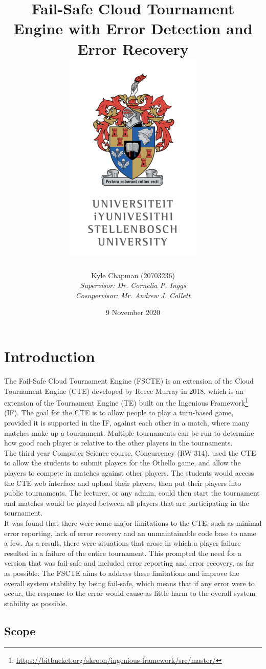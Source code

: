 \documentclass[a4paper, 11pt]{report}
\title{
	{Fail-Safe Cloud Tournament Engine with Error Detection and Error Recovery} \\
	{\includegraphics[scale=1.4]{logo.png}}
}
\author{
	{Kyle Chapman (20703236)} \\
	{\emph{Supervisor: Dr. Cornelia P. Inggs}} \\
	{\emph{Cosupervisor: Mr. Andrew J. Collett}}
}
\date{9 November 2020}
\begin{document}
\maketitle
\tableofcontents

\chapter{Introduction}

The Fail-Safe Cloud Tournament Engine (FSCTE) is an extension of the Cloud
Tournament Engine (CTE) developed by Reece Murray in 2018, which is an extension
of the Tournament Engine (TE) built on the Ingenious Framework\footnote{\url{https://bitbucket.org/skroon/ingenious-framework/src/master/}}
(IF). The goal for the CTE is to allow people to play a turn-based game, provided
it is supported in the IF, against each other in a match, where many matches
make up a tournament. Multiple tournaments can be run to determine how good
each player is relative to the other players in the tournaments. \\

The third year Computer Science course, Concurrency (RW 314), used the CTE to
allow the students to submit players for the Othello game, and allow the players
to \mbox{compete} in matches against other players. The students would
access the CTE web interface and upload their players, then put their players
into public tournaments. The lecturer, or any admin, could then start the
tournament and matches would be played between all players that are participating
in the tournament. \\

It was found that there were some major limitations to the CTE, such as minimal
error reporting, lack of error recovery and an unmaintainable code base to name
a few. As a result, there were situations that arose in which a player failure
resulted in a failure of the entire tournament. This prompted the need for a
version that was fail-safe and included error reporting and error recovery, as
far as possible. The FSCTE aims to address these limitations and improve the
overall system stability by being fail-safe, which means that if any error were
to occur, the response to the error would cause as little harm to the overall
system stability as possible.

\section{Scope}
\end{document}
